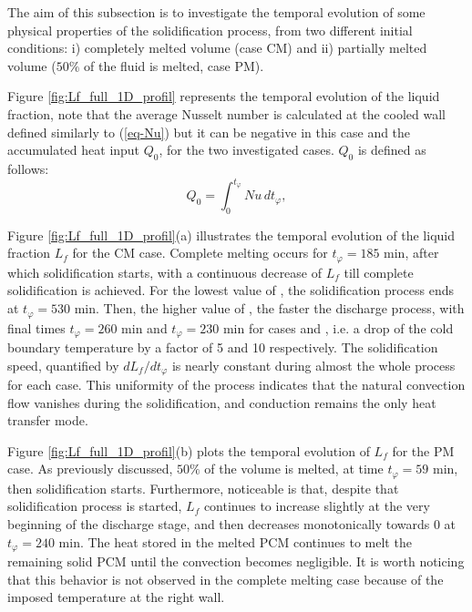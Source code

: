 The aim of this subsection is to investigate the temporal evolution of some physical properties of the solidification process, from two different initial conditions: i) completely melted volume (case CM) and ii) partially melted volume ($50\%$ of the fluid is melted, case PM).  
 
Figure \ref{fig:Lf_full_1D_profil} represents the temporal  evolution of the liquid fraction, note that the average Nusselt number is calculated at the cooled wall defined similarly to (\ref{eq-Nu}) but it can be negative in this case and the accumulated heat input $Q_0$, for the two investigated cases. $Q_0$ is defined as follows:
\begin{equation}
    Q_0 = \int_0^{t_{\varphi}} N\!u \, d t_{\varphi},
    \label{eq-Q0}
\end{equation}


Figure \ref{fig:Lf_full_1D_profil}(a) illustrates the temporal evolution of the liquid fraction $L_f$ for the CM case. 
Complete melting occurs for $t_{\varphi} =185$ min, after which solidification starts, with a continuous decrease of $L_f$ till complete solidification is achieved. 
For the lowest value of , the solidification process ends at $t_{\varphi} = 530$ min. 
Then, the higher value of , the faster the discharge process,
with final times $t_{\varphi} = 260$ min and $t_{\varphi} = 230$ min for cases  and , i.e. a drop of the cold boundary temperature by a factor of 5 and 10 respectively.
The solidification speed, quantified by $d L_f/ d t_{\varphi}$ is  nearly constant during almost the whole process for each case.  
This uniformity of the process indicates that the natural convection flow vanishes during the solidification, and conduction remains the only heat transfer mode.   

Figure \ref{fig:Lf_full_1D_profil}(b) plots the temporal evolution of $L_f$ for the PM case. 
As previously discussed, $50\%$ of the volume is melted, at time $t_{\varphi} = 59$ min, then solidification starts. 
Furthermore, noticeable is that, despite that solidification process is started, $L_f$ continues to increase slightly at the very beginning of the discharge stage, and then decreases monotonically towards $0$ at $t_{\varphi} = 240$ min.
The heat stored in the melted PCM continues to melt the remaining solid PCM until the convection becomes negligible.
It is worth noticing that this behavior is not observed in the complete melting case because of the imposed temperature at the right wall.  


